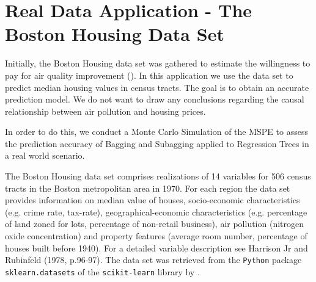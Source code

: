\section{Real Data Application - The Boston Housing Data Set}

Initially, the Boston Housing data set was gathered to estimate the willingness to pay for air quality improvement (\cite{Harrison1978}). In this application we use the data set to predict median housing values in census tracts. The goal is to obtain an accurate prediction model. We do not want to draw any conclusions regarding the causal relationship between air pollution and housing prices.

In order to do this, we conduct a Monte Carlo Simulation of the MSPE to assess the prediction accuracy of Bagging and Subagging applied to Regression Trees in a real world scenario.

The Boston Housing data set comprises realizations of 14 variables for 506 census tracts in the Boston metropolitan area in 1970. For each region the data set provides information on median value of houses, socio-economic characteristics (e.g. crime rate, tax-rate), geographical-economic characteristics (e.g. percentage of land zoned for lots, percentage of non-retail business), air pollution (nitrogen oxide concentration) and property features (average room number, percentage of houses built before 1940). For a detailed variable description see Harrison Jr and Rubinfeld (1978, p.96-97). The data set was retrieved from the \texttt{Python} package \texttt{sklearn.datasets} of the \texttt{scikit-learn} library by \cite{scikit-learn2011}.

\noindent
